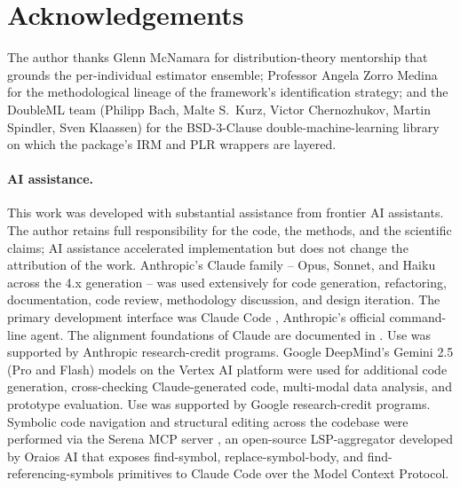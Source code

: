 \documentclass[article,shortnames,nojss]{jss}
\begin{document}
\section*{Acknowledgements}

The author thanks Glenn McNamara for distribution-theory
mentorship that grounds the per-individual estimator ensemble;
Professor Angela Zorro Medina for the methodological lineage of
the framework's identification strategy; and the DoubleML team
(Philipp Bach, Malte S.\ Kurz, Victor Chernozhukov, Martin
Spindler, Sven Klaassen) for the BSD-3-Clause
double-machine-learning library on which the package's IRM and
PLR wrappers are layered.

\paragraph*{AI assistance.}
This work was developed with substantial assistance from frontier
AI assistants.  The author retains full responsibility for the
code, the methods, and the scientific claims; AI assistance
accelerated implementation but does not change the attribution of
the work.  Anthropic's Claude family -- Opus, Sonnet, and Haiku
across the 4.x generation \citep{Anthropic2024ClaudeFamily} -- was
used extensively for code generation, refactoring, documentation,
code review, methodology discussion, and design iteration.  The
primary development interface was Claude Code
\citep{Anthropic2024ClaudeCode}, Anthropic's official
command-line agent.  The alignment foundations of Claude are
documented in \citet{Bai2022ConstitutionalAI}.  Use was supported
by Anthropic research-credit programs.  Google DeepMind's
Gemini 2.5 (Pro and Flash) models
\citep{GoogleDeepMind2024Gemini} on the Vertex AI platform
\citep{GoogleCloud2024VertexAI} were used for additional code
generation, cross-checking Claude-generated code, multi-modal
data analysis, and prototype evaluation.  Use was supported by
Google research-credit programs.  Symbolic code
navigation and structural editing across the codebase were
performed via the Serena MCP server \citep{Oraios2024Serena},
an open-source LSP-aggregator developed by Oraios AI that exposes
find-symbol, replace-symbol-body, and find-referencing-symbols
primitives to Claude Code over the Model Context Protocol.

\end{document}
